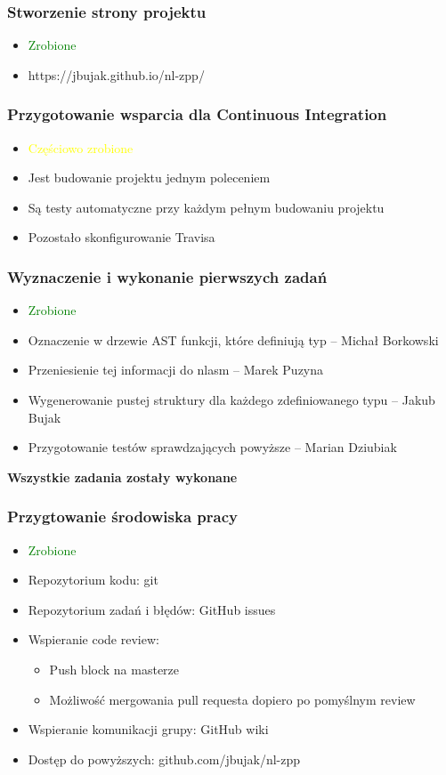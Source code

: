 \documentclass{beamer}
\begin{document}
	\begin{frame}
		\frametitle{Stworzenie strony projektu}
		\begin{itemize}
			\item\textcolor{green}{Zrobione}
			\item https://jbujak.github.io/nl-zpp/ 
		\end{itemize}
	\end{frame}
	
	\begin{frame}
		\frametitle{Przygotowanie wsparcia dla Continuous Integration}
		\begin{itemize}
			\item\textcolor{yellow}{Częściowo zrobione}
			\item Jest budowanie projektu jednym poleceniem
			\item Są testy automatyczne przy każdym pełnym budowaniu projektu
			\item Pozostało skonfigurowanie Travisa
		\end{itemize}
	\end{frame}
	
	\begin{frame}
		\frametitle{Wyznaczenie i wykonanie pierwszych zadań}
		\begin{itemize}
			\item \textcolor{green}{Zrobione}
			\item Oznaczenie w drzewie AST funkcji, które definiują typ -- Michał Borkowski
			\item Przeniesienie tej informacji do nlasm -- Marek Puzyna
			\item Wygenerowanie pustej struktury dla każdego zdefiniowanego typu -- Jakub Bujak
			\item Przygotowanie testów sprawdzających powyższe -- Marian Dziubiak
		\end{itemize}
		\pause
		\textbf{Wszystkie zadania zostały wykonane}
	\end{frame}
	
	\begin{frame}
		\frametitle{Przygtowanie środowiska pracy}
		\begin{itemize}
		 \item\textcolor{green}{Zrobione}
		 \item Repozytorium kodu: git
		 \item Repozytorium zadań i błędów: GitHub issues
		 \item Wspieranie code review:
			\begin{itemize}
			\item Push block na masterze
			\item Możliwość mergowania pull requesta dopiero po pomyślnym review
			\end{itemize}
		\item Wspieranie komunikacji grupy: GitHub wiki
		\item Dostęp do powyższych: github.com/jbujak/nl-zpp
		\end{itemize}
	\end{frame}
	
\end{document}

